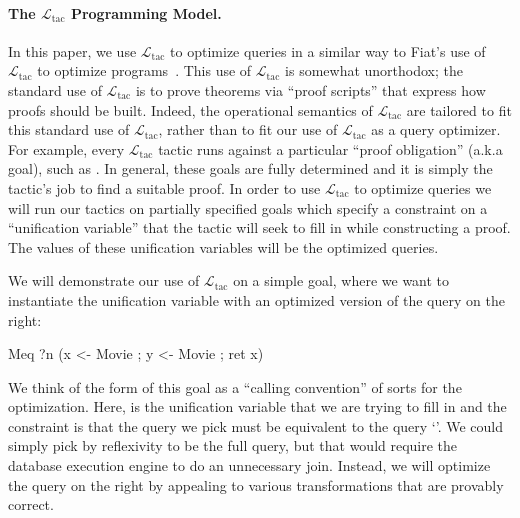 \documentclass[preprint]{sigplanconf}
\newcommand{\ltac}[0]{\ensuremath{\mathcal{L}_{\mathrm{tac}}}}
\begin{document}
\paragraph{The \ltac{} Programming Model.}
In this paper, we use \ltac{} to optimize queries in a similar way to Fiat's use of \ltac{} to optimize programs~\cite{DBLP:conf/popl/DelawarePGC15}.
This use of \ltac{} is somewhat unorthodox; the standard use of \ltac{} is to prove theorems via ``proof scripts'' that express how proofs should be built.
Indeed, the operational semantics of \ltac{} are tailored to fit this standard use of \ltac{}, rather than to fit our use of \ltac{} as a query optimizer.
For example, every \ltac{} tactic runs against a particular ``proof obligation'' (a.k.a goal), such as .
In general, these goals are fully determined and it is simply the tactic's job to find a suitable proof.
In order to use \ltac{} to optimize queries we will run our tactics on partially specified goals which specify a constraint on a ``unification variable'' that the tactic will seek to fill in while constructing a proof.
The values of these unification variables will be the optimized queries.


We will demonstrate our use of \ltac{} on a simple goal, where we want to instantiate the unification variable  with an optimized version of the query on the right:
\begin{coq}
Meq ?n (x <- Movie ; y <- Movie ; ret x)
\end{coq}
We think of the form of this goal as a ``calling convention'' of sorts for the optimization.
Here,  is the unification variable that we are trying to fill in and the constraint is that the query we pick must be equivalent to the query `'.
We could simply pick  by reflexivity to be the full query, but that would require the database execution engine to do an unnecessary join.
Instead, we will optimize the query on the right by appealing to various transformations that are provably correct.
\end{document}
